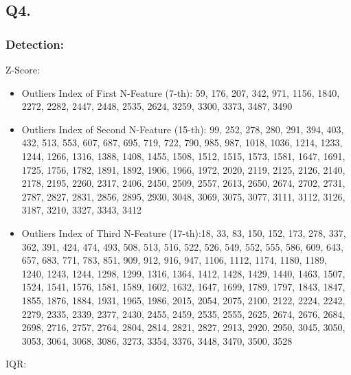 \documentclass{article}
\begin{document}
\newpage

\subsection*{Q4.}
\subsubsection*{Detection:}
Z-Score:\\
\begin{itemize}
    \item Outliers Index of First N-Feature (7-th): 59,  176,  207,  342,  971, 1156, 1840, 2272, 2282, 2447, 2448, 2535, 2624, 3259, 3300, 3373, 3487, 3490
    \item Outliers Index of Second N-Feature (15-th): 99,  252,  278,  280,  291,  394,  403,  432,  513,  553,  607, 
    687,  695,  719,  722,  790,  985,  987, 1018, 1036, 1214, 1233,
    1244, 1266, 1316, 1388, 1408, 1455, 1508, 1512, 1515, 1573, 1581,
    1647, 1691, 1725, 1756, 1782, 1891, 1892, 1906, 1966, 1972, 2020,
    2119, 2125, 2126, 2140, 2178, 2195, 2260, 2317, 2406, 2450, 2509,
    2557, 2613, 2650, 2674, 2702, 2731, 2787, 2827, 2831, 2856, 2895,
    2930, 3048, 3069, 3075, 3077, 3111, 3112, 3126, 3187, 3210, 3327,
    3343, 3412
    \item Outliers Index of Third N-Feature (17-th):18,   33,   83,  150,  152,  173,  278,  337,  362,  391,  424,
    474,  493,  508,  513,  516,  522,  526,  549,  552,  555,  586,
    609,  643,  657,  683,  771,  783,  851,  909,  912,  916,  947,
   1106, 1112, 1174, 1180, 1189, 1240, 1243, 1244, 1298, 1299, 1316,
   1364, 1412, 1428, 1429, 1440, 1463, 1507, 1524, 1541, 1576, 1581,
   1589, 1602, 1632, 1647, 1699, 1789, 1797, 1843, 1847, 1855, 1876,
   1884, 1931, 1965, 1986, 2015, 2054, 2075, 2100, 2122, 2224, 2242,
   2279, 2335, 2339, 2377, 2430, 2455, 2459, 2535, 2555, 2625, 2674,
   2676, 2684, 2698, 2716, 2757, 2764, 2804, 2814, 2821, 2827, 2913,
   2920, 2950, 3045, 3050, 3053, 3064, 3068, 3086, 3273, 3354, 3376,
   3448, 3470, 3500, 3528
\end{itemize}

IQR:\\
\end{document}
